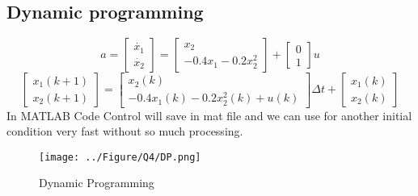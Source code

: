 \subsection{Dynamic programming}
$$
a = \begin{bmatrix}
	\dot{x_1}\\
	\dot{x_2}
\end{bmatrix} = \begin{bmatrix}
	x_2\\
	-0.4x_1 -0.2x_2^2
\end{bmatrix} + \begin{bmatrix}
	0\\
	1
\end{bmatrix}u
$$
$$
\begin{bmatrix}
	x_1(k+1)\\
	x_2(k+1)
\end{bmatrix} = \begin{bmatrix}
	x_2(k)\\
	-0.4x_1(k) -0.2x_2^2(k) + u(k)
\end{bmatrix} \Delta t + \begin{bmatrix}
	x_1(k)\\
	x_2(k)
\end{bmatrix}
$$
In MATLAB Code Control will save in mat file and we can use for another initial condition very fast without so much processing.
\begin{figure}[H]
	\caption{Dynamic Programming}
	\centering
	\texttt{[image: ../Figure/Q4/DP.png]}
\end{figure}